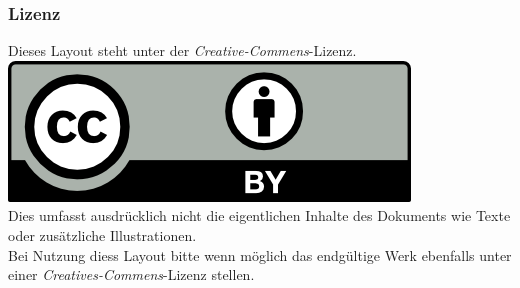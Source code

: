 \documentclass[12pt, a4paper, twoside, openany]{book}
\begin{document}
{        \subsection*{Lizenz}
        \begin{center}
                \tiny
                Dieses Layout steht unter der \textit{Creative-Commens}-Lizenz. \\
                \includegraphics[scale=1]{bilder/Splittermond_Fanpaket/CC-BY.png}\\
                Dies umfasst ausdrücklich nicht die eigentlichen Inhalte des Dokuments wie Texte oder zusätzliche Illustrationen. \\
                Bei Nutzung diess Layout bitte wenn möglich das endgültige Werk ebenfalls unter einer \textit{Creatives-Commens}-Lizenz stellen. 
        \end{center}
}
        \tableofcontents
\chapter*{\MyTitle}
\end{document}
